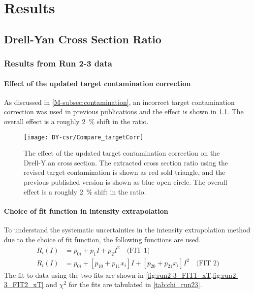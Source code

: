 \documentclass[../main.tex]{subfiles}
\begin{document}
\ifSubfilesClassLoaded{
	\mainmatter
	\setcounter{chapter}{5}
}{}

\chapter{Results}
\label{ch:result}
\section{Drell-Yan Cross Section Ratio}
\subsection{Results from Run 2-3 data}
\subsubsection{Effect of the updated target contamination correction}
\label{subsubsec:contamination_result}
As discussed in \cref{M-subsec:contamination}, an incorrect target contamination correction was used
in previous publications and the effect is shown in \cref{fig:contaimination_CSR}.
The overall effect is a roughly \SI{2}{\percent} shift in the ratio.
\begin{figure}[h!]
	\centering
	\texttt{[image: DY-csr/Compare\_targetCorr]}
	\caption{The effect of the updated target contamination correction on the Drell-Y.an
		cross section. The extracted cross section ratio using the revised target contamination
		is shown as red sold triangle, and the previous published version is shown as blue open
		circle. The overall effect is a roughly \SI{2}{\percent} shift in the ratio. }
	\label{fig:contaimination_CSR}
\end{figure}



\subsubsection{Choice of fit function in intensity extrapolation}
To understand the systematic uncertainties in the intensity extrapolation method due to the
choice of fit function, the following functions are used.
\begin{align}
	R_i\left(I\right) &= p_{0i} + p_{1} I + p_{2} I^2 \quad\text{(FIT 1)}\\
	R_i\left(I\right) &= p_{0i} + \left[p_{10} + p_{11}x_i\right] I + \left[p_{20} + p_{21}x_i\right]I^2 \quad \text{(FIT 2)}
\end{align}
The fit to data using the two fits are shown in \cref{fig:run2-3_FIT1_xT,fig:run2-3_FIT2_xT}
and $\chi^2$ for the fits are tabulated in \cref{tab:chi_run23}.


\end{document}
